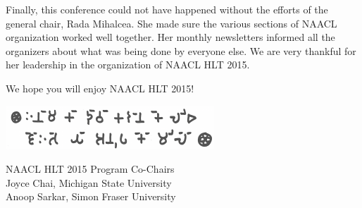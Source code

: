 Finally, this conference could not have happened without the efforts
of the general chair, Rada Mihalcea. She made sure the various
sections of NAACL organization worked well together. Her monthly
newsletters informed all the organizers about what was being done
by everyone else. We are very thankful for her leadership in the
organization of NAACL HLT 2015.

We hope you will enjoy NAACL HLT 2015!

\includegraphics[scale=1.5]{content/fmatter/easteregg.pdf}

NAACL HLT 2015 Program Co-Chairs \\
Joyce Chai, Michigan State University \\
Anoop Sarkar, Simon Fraser University
